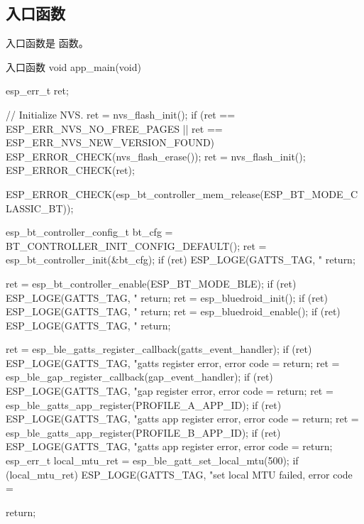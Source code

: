 \documentclass[lang=cn,newtx,10pt,scheme=chinese]{elegantbook}
\begin{document}
\subsection{入口函数}

入口函数是  函数。

\begin{mycode}{入口函数}
void app_main(void)
{
    esp_err_t ret;

    // Initialize NVS.
    ret = nvs_flash_init();
    if (ret == ESP_ERR_NVS_NO_FREE_PAGES || ret == ESP_ERR_NVS_NEW_VERSION_FOUND)
    {
        ESP_ERROR_CHECK(nvs_flash_erase());
        ret = nvs_flash_init();
    }
    ESP_ERROR_CHECK(ret);

    ESP_ERROR_CHECK(esp_bt_controller_mem_release(ESP_BT_MODE_CLASSIC_BT));

    esp_bt_controller_config_t bt_cfg = BT_CONTROLLER_INIT_CONFIG_DEFAULT();
    ret = esp_bt_controller_init(&bt_cfg);
    if (ret)
    {
        ESP_LOGE(GATTS_TAG, "%
        return;
    }

    ret = esp_bt_controller_enable(ESP_BT_MODE_BLE);
    if (ret)
    {
        ESP_LOGE(GATTS_TAG, "%
        return;
    }
    ret = esp_bluedroid_init();
    if (ret)
    {
        ESP_LOGE(GATTS_TAG, "%
        return;
    }
    ret = esp_bluedroid_enable();
    if (ret)
    {
        ESP_LOGE(GATTS_TAG, "%
        return;
    }

    ret = esp_ble_gatts_register_callback(gatts_event_handler);
    if (ret)
    {
        ESP_LOGE(GATTS_TAG, "gatts register error, error code = %
        return;
    }
    ret = esp_ble_gap_register_callback(gap_event_handler);
    if (ret)
    {
        ESP_LOGE(GATTS_TAG, "gap register error, error code = %
        return;
    }
    ret = esp_ble_gatts_app_register(PROFILE_A_APP_ID);
    if (ret)
    {
        ESP_LOGE(GATTS_TAG, "gatts app register error, error code = %
        return;
    }
    ret = esp_ble_gatts_app_register(PROFILE_B_APP_ID);
    if (ret)
    {
        ESP_LOGE(GATTS_TAG, "gatts app register error, error code = %
        return;
    }
    esp_err_t local_mtu_ret = esp_ble_gatt_set_local_mtu(500);
    if (local_mtu_ret)
    {
        ESP_LOGE(GATTS_TAG, "set local  MTU failed, error code = %
    }

    return;
}
\end{mycode}
\end{document}
